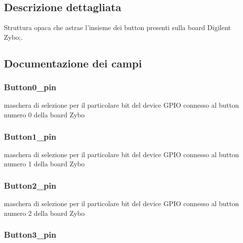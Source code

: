 \subsection{Descrizione dettagliata}
Struttura opaca che astrae l'insieme dei button presenti sulla board Digilent Zybo;. 

\subsection{Documentazione dei campi}
\hypertarget{struct_zybo_button__t_aa079dc844a7d73e98b762cef39e9bf90}{
\subsubsection[{Button0\+\_\+pin}]{ Button0\+\_\+pin}}\label{struct_zybo_button__t_aa079dc844a7d73e98b762cef39e9bf90}
maschera di selezione per il particolare bit del device G\+P\+I\+O connesso al button numero 0 della board Zybo \hypertarget{struct_zybo_button__t_aa4b6f01d89a502266798176affa8f59b}{
\subsubsection[{Button1\+\_\+pin}]{ Button1\+\_\+pin}}\label{struct_zybo_button__t_aa4b6f01d89a502266798176affa8f59b}
maschera di selezione per il particolare bit del device G\+P\+I\+O connesso al button numero 1 della board Zybo \hypertarget{struct_zybo_button__t_a249726210aba837b00df4d2afc89965d}{
\subsubsection[{Button2\+\_\+pin}]{ Button2\+\_\+pin}}\label{struct_zybo_button__t_a249726210aba837b00df4d2afc89965d}
maschera di selezione per il particolare bit del device G\+P\+I\+O connesso al button numero 2 della board Zybo \hypertarget{struct_zybo_button__t_a0be2104e3b0077272dcbfee7dbdb14ee}{
\subsubsection[{Button3\+\_\+pin}]{ Button3\+\_\+pin}}\label{struct_zybo_button__t_a0be2104e3b0077272dcbfee7dbdb14ee}
